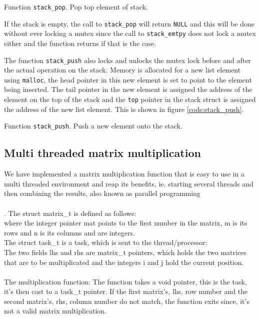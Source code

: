{Function \texttt{stack\_pop}. Pop top element of stack.}

If the stack is empty, the call to \verb|stack_pop| will return \verb|NULL| and
this will be done without ever locking a mutex since the call to
\verb|stack_emtpy| does not lock a mutex either and the function returns if that
is the case.

The function \verb|stack_push| also locks and unlocks the mutex lock before and
after the actual operation on the stack. Memory is allocated for a new list
element using \verb|malloc|, the head pointer in this new element is set to
point to the element being inserted. The tail pointer in the new element is
assigned the address of the element on the top of the stack and the \verb|top|
pointer in the stack struct is assigned the address of the new list element.
This is shown in figure \ref{code:stack_push}.

{Function \texttt{stack\_push}. Push a new element onto the stack.}


\subsection{Multi threaded matrix multiplication}
We have implemented a matrix multiplication function that is easy to use in a
multi threaded environment and reap its benefits, ie. starting several threads
and then combining the results, also known as parallel programming\\
\\.
The \textsf{struct matrix\_t} is defined as follows:\\
where the integer pointer \textsf{mat} points to the first number in the matrix,
\textsf{m} is its rows and \textsf{n} is its columns and are integers.\\
The \textsf{struct task\_t} is a task, which is sent to the thread/processor:\\
The two fields \textsf{lhs} and \textsf{rhs} are matrix\_t pointers, which holds the two
matrices that are to be multiplicated and the integers \textsf{i} and \textsf{j} hold
the current position.\\
\\
The multiplication function:
The function takes a void pointer, this is the task, it's then cast to a task\_t
pointer. If the first matrix's, lhs, row number and the second matrix's, rhs,
column number do not match, the function exits since, it's not a valid matrix
multiplication.
